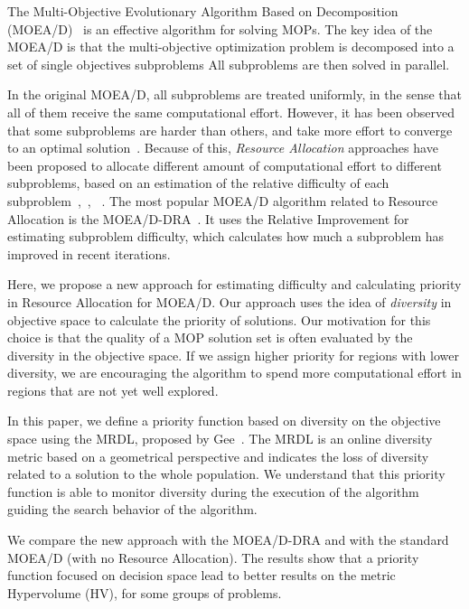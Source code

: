 The Multi-Objective Evolutionary Algorithm Based on Decomposition
(MOEA/D)~\cite{zhang2007moea} is an effective algorithm for solving MOPs. The
key idea of the MOEA/D is that the multi-objective optimization problem is
decomposed into a set of single objectives subproblems All subproblems
are then solved in parallel.

In the original MOEA/D, all subproblems are treated uniformly, in the sense that
all of them receive the same computational effort. However, it has been observed
that some subproblems are harder than others, and take more effort to converge
to an optimal solution~\cite{zhou2016all}. Because of this, \emph{Resource
	Allocation} approaches have been proposed to allocate different amount of
computational effort to different subproblems, based on an estimation of the
relative difficulty of each subproblem~\cite{zhou2016all},~\cite{zhang2009performance},	~\cite{kang2018collaborative}. The most popular MOEA/D algorithm related to Resource Allocation is the MOEA/D-DRA~\cite{zhang2009performance}. It uses the Relative Improvement for estimating subproblem
difficulty, which calculates how much a subproblem
has improved in recent iterations.


Here, we propose a new approach for estimating difficulty and
calculating priority in Resource Allocation for MOEA/D. Our approach uses the
idea of \emph{diversity} in objective space to calculate
the priority of solutions. Our motivation for this choice is that the quality of
a MOP solution set is often evaluated by the diversity in the objective space.
If we assign higher priority for regions with lower diversity, we are
encouraging the algorithm to spend more computational effort in regions that are
not yet well explored.

In this paper, we define a priority function based on diversity on the objective space using the MRDL, proposed by Gee~\cite{gee2015online}. The MRDL is an online diversity metric based on a geometrical perspective and indicates the loss of diversity related to a solution to the whole population. We understand that this priority function is able to monitor diversity during the execution of the algorithm guiding the search behavior of the algorithm.


We compare the new approach with the MOEA/D-DRA and with the standard MOEA/D (with no Resource Allocation). The results show that a priority function focused on decision space lead to better results on the metric Hypervolume (HV), for some groups of problems.


